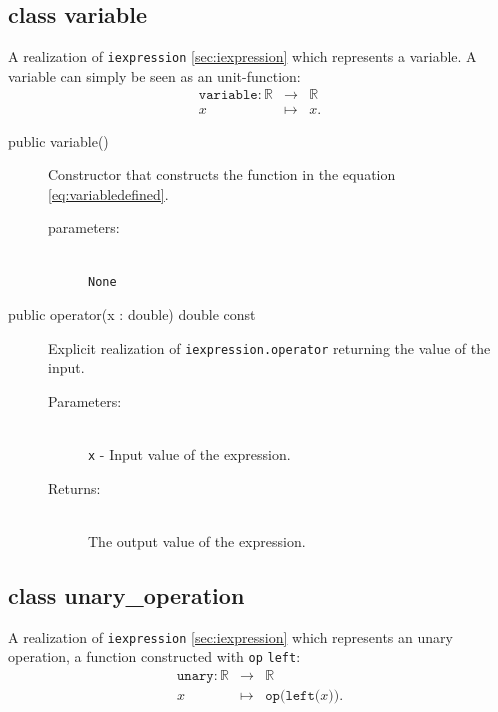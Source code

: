 \documentclass[a4paper,11pt]{kth-mag}
\newcommand{\RR}{\ensuremath{\mathbb{R}}}
\begin{document}
\subsection{class variable} A realization of \texttt{iexpression}
\ref{sec:iexpression} which represents a variable. A variable can simply be
seen as an unit-function:
\begin{eqnarray}
    \label{eq:variabledefined}
    \texttt{variable}: \RR &\rightarrow& \RR \nonumber \\
    x &\mapsto& x .
\end{eqnarray}
\begin{description}
    \item[public variable()] Constructor 
    that constructs the function in the equation \ref{eq:variabledefined}. 
    \begin{description}
        \item[parameters:]~\\
            \verb+None+
    \end{description}
\end{description}
\begin{description}
    \item[public operator(x : double) double const] 
    Explicit realization of \texttt{iexpression.operator} returning the value
    of the input.
    \begin{description}
        \item[Parameters:]~\\
            \verb+x+ - Input value of the expression.
        \item[Returns:]~\\
            The output value of the expression.
    \end{description}
\end{description}


\subsection{class unary\_operation} A realization of \texttt{iexpression}
\ref{sec:iexpression} which represents an unary operation, a function
constructed with \texttt{op} \texttt{left}:
\begin{eqnarray}
    \label{eq:unarydefined}
    \texttt{unary}:\RR &\rightarrow& \RR \nonumber \\
    x &\mapsto& \texttt{op(left(}x\texttt{))}. 
\end{eqnarray}
\end{document}

